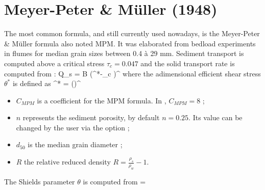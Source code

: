 \section{Meyer-Peter \& Müller (1948)}
\label{app:MPM}

The most common formula, and still currently used nowadays, is the Meyer-Peter \& Müller \cite{MPM} formula also noted MPM. 
It was elaborated from bedload experiments in flumes for median grain sizes between 0.4 à 29 mm. 
Sediment transport is computed above a critical stress $\tau_c = 0.047$ and the solid transport rate is computed from :
\bequ
    Q_s =  B \left(\theta^*-\theta_c \right)^{}
\eequ
where the adimensional efficient shear stress $\theta^*$ is defined as
\bequ
	\theta^* = \left(\right)^{} \theta
\eequ
\begin{itemize}
	\item $C_{MPM}$ is a coefficient for the MPM formula. In \courlis, $C_{MPM} = 8$ ;
	\item $n$ represents the sediment porosity, by default $n=0.25$. Its value can be changed by the user via the option ;
	\item $d_{50}$ is the median grain diameter ;
	\item $R$ the relative reduced density $R=\frac{\rho_s}{\rho_w}-1$.
\end{itemize}

The Shields parameter $\theta$ is computed from 
\bequ
    \label{eq:shields}
    \theta =  
\eequ


